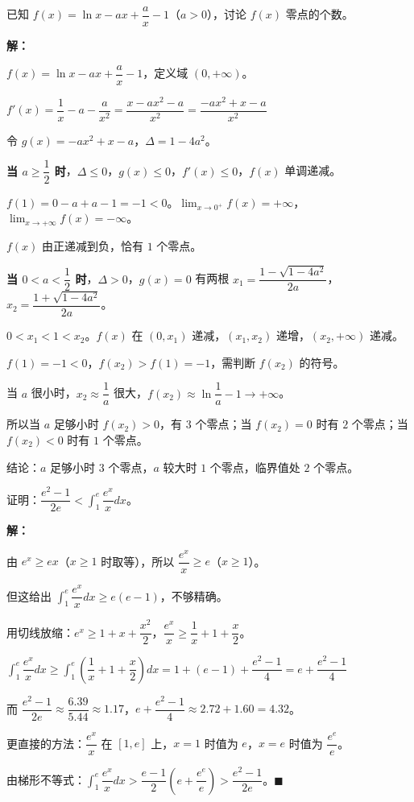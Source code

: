 \documentclass[12pt, a4paper]{ctexart}
\begin{document}
\begin{examplebox}[【例题10】综合压轴——导数+零点+参数]
已知 $f(x)=\ln x - ax + \dfrac{a}{x}-1$（$a>0$），讨论 $f(x)$ 零点的个数。

\textbf{解：}

$f(x)=\ln x - ax + \dfrac{a}{x}-1$，定义域 $(0,+\infty)$。

$f'(x)=\dfrac{1}{x}-a-\dfrac{a}{x^2}=\dfrac{x-ax^2-a}{x^2}=\dfrac{-ax^2+x-a}{x^2}$

令 $g(x)=-ax^2+x-a$，$\Delta=1-4a^2$。

\textbf{当 $a\geq \dfrac{1}{2}$ 时}，$\Delta\leq 0$，$g(x)\leq 0$，$f'(x)\leq 0$，$f(x)$ 单调递减。

$f(1)=0-a+a-1=-1<0$。$\lim_{x\to 0^+}f(x)=+\infty$，$\lim_{x\to+\infty}f(x)=-\infty$。

$f(x)$ 由正递减到负，恰有 $1$ 个零点。

\textbf{当 $0<a<\dfrac{1}{2}$ 时}，$\Delta>0$，$g(x)=0$ 有两根 $x_1=\dfrac{1-\sqrt{1-4a^2}}{2a}$，$x_2=\dfrac{1+\sqrt{1-4a^2}}{2a}$。

$0<x_1<1<x_2$。$f(x)$ 在 $(0,x_1)$ 递减，$(x_1,x_2)$ 递增，$(x_2,+\infty)$ 递减。

$f(1)=-1<0$，$f(x_2)>f(1)=-1$，需判断 $f(x_2)$ 的符号。

当 $a$ 很小时，$x_2\approx \dfrac{1}{a}$ 很大，$f(x_2)\approx \ln\dfrac{1}{a}-1\to+\infty$。

所以当 $a$ 足够小时 $f(x_2)>0$，有 $3$ 个零点；当 $f(x_2)=0$ 时有 $2$ 个零点；当 $f(x_2)<0$ 时有 $1$ 个零点。

结论：$a$ 足够小时 $3$ 个零点，$a$ 较大时 $1$ 个零点，临界值处 $2$ 个零点。
\end{examplebox}

\begin{examplebox}[【例题11】放缩法——$e^x$ 与 $\ln x$ 综合]
证明：$\dfrac{e^2-1}{2e} < \displaystyle\int_1^e \dfrac{e^x}{x}dx$。

\textbf{解：}

由 $e^x\geq ex$（$x\geq 1$ 时取等），所以 $\dfrac{e^x}{x}\geq e$（$x\geq 1$）。

但这给出 $\int_1^e\dfrac{e^x}{x}dx\geq e(e-1)$，不够精确。

用切线放缩：$e^x\geq 1+x+\dfrac{x^2}{2}$，$\dfrac{e^x}{x}\geq \dfrac{1}{x}+1+\dfrac{x}{2}$。

$\int_1^e\dfrac{e^x}{x}dx\geq \int_1^e\left(\dfrac{1}{x}+1+\dfrac{x}{2}\right)dx=1+(e-1)+\dfrac{e^2-1}{4}=e+\dfrac{e^2-1}{4}$

而 $\dfrac{e^2-1}{2e}\approx\dfrac{6.39}{5.44}\approx 1.17$，$e+\dfrac{e^2-1}{4}\approx 2.72+1.60=4.32$。

更直接的方法：$\dfrac{e^x}{x}$ 在 $[1,e]$ 上，$x=1$ 时值为 $e$，$x=e$ 时值为 $\dfrac{e^e}{e}$。

由梯形不等式：$\int_1^e\dfrac{e^x}{x}dx>\dfrac{e-1}{2}\left(e+\dfrac{e^e}{e}\right)>\dfrac{e^2-1}{2e}$。$\blacksquare$
\end{examplebox}
\end{document}
